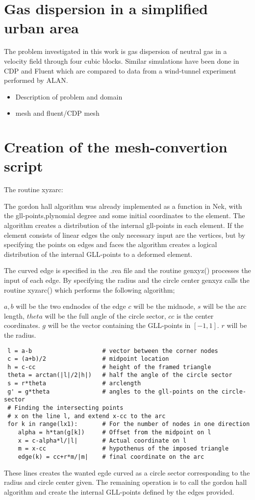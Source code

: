 \section{Gas dispersion in a simplified urban area}
The problem investigated in this work is gas dispersion of neutral gas in a velocity field through four cubic blocks.
Similar simulations have been done in CDP and Fluent which are compared to data from a wind-tunnel experiment performed by ALAN.
\begin{itemize}
	\item Description of problem and domain
	\item mesh and fluent/CDP mesh
\end{itemize}

\section{Creation of the mesh-convertion script}
The routine xyzarc:

The gordon hall algorithm was already implemented as a function in Nek, with the gll-points,plynomial degree and some initial 
coordinates to the element. The algorithm creates a distribution of the internal gll-points in each element. 
If the element consists of linear edges the only necessary input are the vertices, but by specifying the points on edges and faces
the algorithm creates a logical distribution of the internal GLL-points to a deformed element. 

The curved edge is specified in the .rea file and the routine genxyz() processes the input of each edge. 
By specifying the radius and the circle center genxyz calls the routine xyzarc() which performs the following algorithm;

    $a,b$ will be the two endnodes of the edge 
    $c$ will be the midnode, $s$ will be the arc length, $theta$ will be the full angle of the circle sector, $cc$ is the center coordinates.
    $g$ will be the vector containing the GLL-points in $[-1,1]$. $r$ will be the radius.
\begin{lstlisting}
 l = a-b                    # vector between the corner nodes
 c = (a+b)/2                # midpoint location
 h = c-cc                   # height of the framed triangle
 theta = arctan(|l|/2|h|)   # half the angle of the circle sector
 s = r*theta                # arclength
 g' = g*theta               # angles to the gll-points on the circle-sector
 # Finding the intersecting points
 # x on the line l, and extend x-cc to the arc 
 for k in range(lx1):       # For the number of nodes in one direction
    alpha = h*tan(g[k])     # Offset from the midpoint on l
    x = c-alpha*l/|l|       # Actual coordinate on l
    m = x-cc                # hypothenus of the imposed triangle
    edge(k) = cc+r*m/|m|    # final coordinate on the arc
\end{lstlisting}
These lines creates the wanted egde curved as a circle sector corresponding to the radius and circle center given.
The remaining operation is to call the gordon hall algorithm and create the internal GLL-points defined by the edges 
provided.


